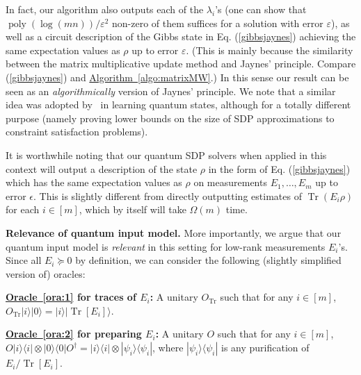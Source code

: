 \documentclass[a4paper,UKenglish,cleveref, autoref]{lipics-v2019}
\theoremstyle{remark}
\numberwithin{equation}{section}
\numberwithin{oracle}{section}
\numberwithin{remark}{section}
\newcommand{\ora}[1]{\hyperref[ora:#1]{Oracle~\ref*{ora:#1}}}
\newcommand{\algo}[1]{\hyperref[algo:#1]{Algorithm~\ref*{algo:#1}}}
\def\>{\rangle}
\def\<{\langle}
\newcommand{\range}[1]{[#1]}
\DeclareMathOperator{\poly}{poly}
\DeclareMathOperator{\Tr}{Tr}
\newcommand{\hd}[1]{\vspace{2mm} \noindent \textbf{#1}}
\begin{document}
In fact, our algorithm also outputs each of the $\lambda_i$'s (one can show that $\poly(\log(mn))/\varepsilon^2$ non-zero of them suffices for a solution with error $\varepsilon$), as well as a circuit description of the Gibbs state in Eq. (\ref{gibbsjaynes}) achieving the same expectation values as $\rho$ up to error $\varepsilon$.
(This is mainly because the similarity between the matrix multiplicative update method and Jaynes' principle. Compare (\ref{gibbsjaynes}) and \algo{matrixMW}.)
In this sense our result can be seen as an \emph{algorithmically} version of Jaynes' principle. We note that a similar idea was adopted by~\cite{LRS15} in learning quantum states, although for a totally different purpose (namely proving lower bounds on the size of SDP approximations to constraint satisfaction problems).

It is worthwhile noting that our quantum SDP solvers when applied in this context will output a description of the state $\rho$ in the form of Eq. (\ref{gibbsjaynes}) which has the same expectation values as $\rho$ on measurements $E_1,\ldots,E_m$ up to error $\epsilon$. This is slightly different from directly outputting estimates of $\Tr(E_i \rho)$ for each $i \in [m]$, which by itself will take $\Omega(m)$ time.

\hd{Relevance of quantum input model.} More importantly, we argue that our quantum input model is \emph{relevant} in this setting for low-rank measurements $E_i$'s.
Since all $E_i \succeq 0$ by definition, we can consider the following (slightly simplified version of) oracles:

\hd{\ora{1} for traces of $E_{i}$:} A unitary $O_{\Tr}$ such that for any $i\in\range{m}$, $O_{\Tr}|i\>|0\>=|i\>|\Tr[E_{i}]\>$.

\hd{\ora{2} for preparing $E_{i}$:} A unitary $O$ such that for any $i\in\range{m}$,
$O|i\>\<i|\otimes |0\>\<0|O^{\dagger}=|i\>\<i|\otimes |\psi_i\>\<\psi_i|$,
where $|\psi_i\>\<\psi_i|$ is any purification of $E_{i}/\Tr[E_{i}]$.
\end{document}
